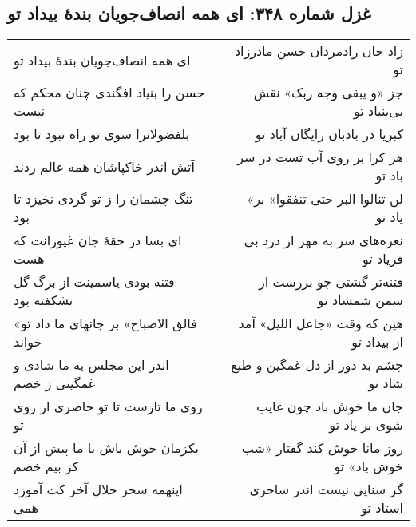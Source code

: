 \begin{center}
\section*{غزل شماره ۳۴۸: ای همه انصاف‌جویان بندهٔ بیداد تو}
\label{sec:348}
\begin{longtable}{l p{0.5cm} r}
ای همه انصاف‌جویان بندهٔ بیداد تو
&&
زاد جان رادمردان حسن مادرزاد تو
\\
حسن را بنیاد افگندی چنان محکم که نیست
&&
جز «و یبقی وجه ربک» نقش بی‌بنیاد تو
\\
بلفضولانرا سوی تو راه نبود تا بود
&&
کبریا در بادبان رایگان آباد تو
\\
آتش اندر خاکپاشان همه عالم زدند
&&
هر کرا بر روی آب تست در سر باد تو
\\
تنگ چشمان را ز تو گردی نخیزد تا بود
&&
«لن تنالوا البر حتی تنفقوا» بر یاد تو
\\
ای بسا در حقهٔ جان غیورانت که هست
&&
نعره‌های سر به مهر از درد بی فریاد تو
\\
فتنه بودی یاسمینت از برگ گل نشکفته بود
&&
فتنه‌تر گشتی چو بررست از سمن شمشاد تو
\\
«فالق الاصباح» بر جانهای ما داد تو خواند
&&
هین که وقت «جاعل اللیل» آمد از بیداد تو
\\
اندر این مجلس به ما شادی و غمگینی ز خصم
&&
چشم بد دور از دل غمگین و طبع شاد تو
\\
روی ما تازست تا تو حاضری از روی تو
&&
جان ما خوش باد چون غایب شوی بر یاد تو
\\
یکزمان خوش باش با ما پیش از آن کز بیم خصم
&&
روز مانا خوش کند گفتار «شب خوش باد» تو
\\
اینهمه سحر حلال آخر کت آموزد همی
&&
گر سنایی نیست اندر ساحری استاد تو
\\
\end{longtable}
\end{center}
